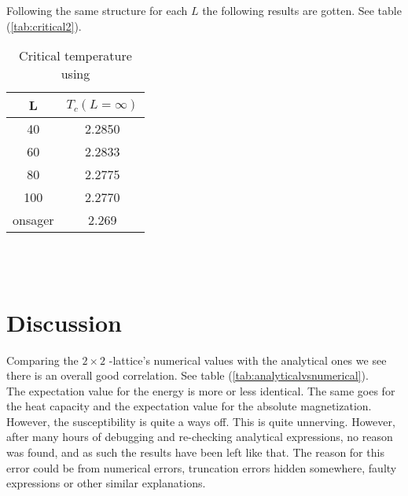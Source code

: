 \documentclass{article}
\begin{document}
  Following the same structure for each $L$ the following results are gotten. See table (\ref{tab:critical2}).

    \begin{table}[ht]
      \centering
      \caption{Critical temperature using \cite{onsager}}
      \vspace{2mm}
      \label{tab:critical}
      \begin{tabular}{|c|c|}
          \hline
           L & $T_c(L=\infty)$\\
          \hline \hline
          40  & 2.2850 \\
          60  & 2.2833 \\
          80  & 2.2775 \\
          100 & 2.2770 \\
          onsager & 2.269 \\
          \hline
      \end{tabular} \\
      \hspace{0pt}\\
    \end{table}
\fi

\vspace{1cm}

\clearpage
\newpage

\section{Discussion} \label{sec:Discussion}

\iffalse
Comparing the \texorpdfstring{ $2 \times 2$ }{text}-lattice's numerical values with the analytical ones we see there is an overall good correlation. See table (\ref{tab:analyticalvsnumerical}).\\

The expectation value for the energy is more or less identical. The same goes for the heat capacity and the expectation value for the absolute magnetization.\\

However, the susceptibility is quite a ways off.
This is quite unnerving. However, after many hours of debugging and re-checking analytical expressions, no reason was found, and as such the results have been left like that. The reason for this error could be from numerical errors, truncation errors hidden somewhere, faulty expressions or other similar explanations.\\
\end{document}
